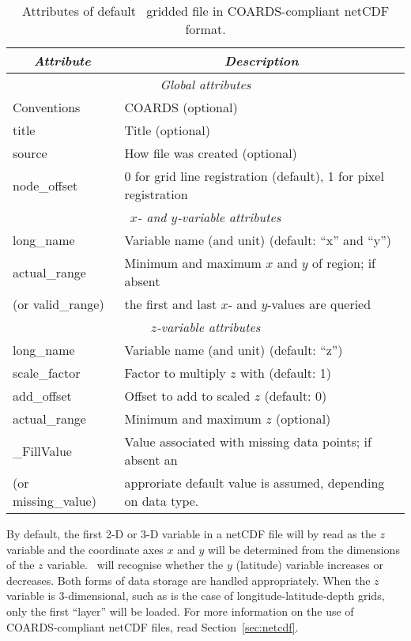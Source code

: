 \begin{table}
\centering
\begin{tabular}{|l|l|} \hline
\multicolumn{1}{|c}{\emph{Attribute}}   &       \multicolumn{1}{|c|}{\emph{Description}}        \\ \hline
\multicolumn{2}{|c|}{\emph{Global attributes}} \\ \hline
Conventions			& COARDS (optional) \\ \hline
title				& Title (optional) \\ \hline
source				& How file was created (optional) \\ \hline
node\_offset			& 0 for grid line registration (default), 1 for pixel registration \\ \hline
\multicolumn{2}{|c|}{\emph{$x$- and $y$-variable attributes}} \\ \hline
long\_name			& Variable name (and unit) (default: ``x'' and ``y'') \\ \hline
actual\_range			& Minimum and maximum $x$ and $y$ of region; if absent \\
(or valid\_range)		& the first and last $x$- and $y$-values are queried \\ \hline
\multicolumn{2}{|c|}{\emph{$z$-variable attributes}} \\ \hline
long\_name			& Variable name (and unit) (default: ``z'') \\ \hline
scale\_factor			& Factor to multiply $z$ with (default: 1) \\ \hline
add\_offset			& Offset to add to scaled $z$ (default: 0) \\ \hline
actual\_range			& Minimum and maximum $z$ (optional) \\ \hline
\_FillValue			& Value associated with missing data points; if absent an\\
(or missing\_value)		& approriate default value is assumed, depending on data type. \\ \hline
\end{tabular} 
\caption{Attributes of default \gmt\ gridded file in COARDS-compliant netCDF format.}
\label{tbl:netcdf-format}
\end{table}

By default, the first 2-D or 3-D variable in a netCDF file will by read as the $z$ variable
and the coordinate axes $x$ and $y$ will be determined from the dimensions of the $z$ variable.
\GMT\ will recognise whether the $y$ (latitude) variable increases or decreases. Both forms of
data storage are handled appropriately. When the $z$ variable is 3-dimensional, such as
is the case of longitude-latitude-depth grids, only the first ``layer'' will be loaded.
For more information on the use of COARDS-compliant netCDF files, read Section~\ref{sec:netcdf}.

